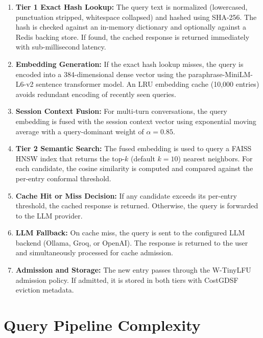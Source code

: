 \documentclass[12pt,a4paper]{report}
\begin{document}
\begin{enumerate}[label=(\roman*),leftmargin=2cm]
\item \textbf{Tier 1 Exact Hash Lookup:} The query text is normalized (lowercased, punctuation stripped, whitespace collapsed) and hashed using SHA-256. The hash is checked against an in-memory dictionary and optionally against a Redis backing store. If found, the cached response is returned immediately with sub-millisecond latency.

\item \textbf{Embedding Generation:} If the exact hash lookup misses, the query is encoded into a 384-dimensional dense vector using the paraphrase-MiniLM-L6-v2 sentence transformer model. An LRU embedding cache (10,000 entries) avoids redundant encoding of recently seen queries.

\item \textbf{Session Context Fusion:} For multi-turn conversations, the query embedding is fused with the session context vector using exponential moving average with a query-dominant weight of $\alpha = 0.85$.

\item \textbf{Tier 2 Semantic Search:} The fused embedding is used to query a FAISS HNSW index that returns the top-$k$ (default $k=10$) nearest neighbors. For each candidate, the cosine similarity is computed and compared against the per-entry conformal threshold.

\item \textbf{Cache Hit or Miss Decision:} If any candidate exceeds its per-entry threshold, the cached response is returned. Otherwise, the query is forwarded to the LLM provider.

\item \textbf{LLM Fallback:} On cache miss, the query is sent to the configured LLM backend (Ollama, Groq, or OpenAI). The response is returned to the user and simultaneously processed for cache admission.

\item \textbf{Admission and Storage:} The new entry passes through the W-TinyLFU admission policy. If admitted, it is stored in both tiers with CostGDSF eviction metadata.
\end{enumerate}

\section{Query Pipeline Complexity}
\end{document}
